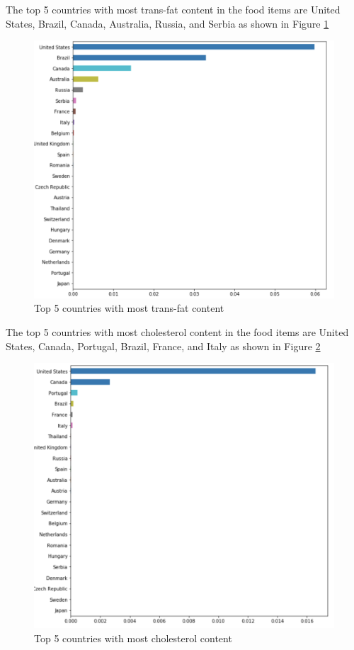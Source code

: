 \documentclass[sigconf]{acmart}
\begin{document}
    
The top 5 countries with most trans-fat content in the food items are United States, Brazil, Canada, Australia, Russia, and Serbia as shown in Figure \ref{fig:Fig10} \\
	
\begin{figure}
\includegraphics[width=1.0\columnwidth]{images/fig10.png}
\caption{Top 5 countries with most trans-fat content \cite{code-base}}
\label{fig:Fig10}
\end{figure}
        
The top 5 countries with most cholesterol content in the food items are United States, Canada, Portugal, Brazil, France, and Italy as shown in Figure \ref{fig:Fig11} \\
	
\begin{figure}
\includegraphics[width=1.0\columnwidth]{images/fig11.png}
\caption{Top 5 countries with most cholesterol content \cite{code-base}}
\label{fig:Fig11}
\end{figure}
\end{document}
